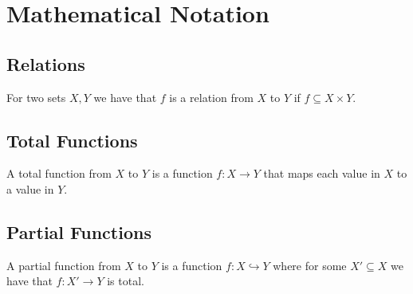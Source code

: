\section{Mathematical Notation}

\subsection{Relations}

For two sets $X, Y$ we have that $f$ is a relation from $X$ to $Y$ if
$f \subseteq X \times Y$.

\subsection{Total Functions}

A total function from $X$ to $Y$ is a function $f : X \to Y$
that maps each value in $X$ to a value in $Y$. 

\subsection{Partial Functions}

A partial function from $X$ to $Y$ is a function 
$f : X \hookrightarrow Y$ where for some $X' \subseteq X$ we have
that $f : X' \to Y$ is total.